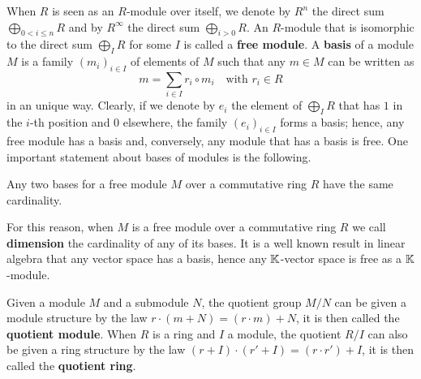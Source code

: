 When $R$ is seen as an $R$-module over itself, we denote by $R^n$ the
direct sum $\bigoplus_{0<i\le n}R$ and by $R^\infty$ the direct sum
$\bigoplus_{i>0}R$. An $R$-module that is isomorphic to the direct sum
$\bigoplus_{I}R$ for some $I$ is called a
\textbf{free module}. A \textbf{basis}
of a module $M$ is a family $(m_i)_{i\in I}$ of elements of $M$ such
that any $m\in M$ can be written as 
\begin{equation}
  \label{eq:module-basis}
  m = \sum_{i\in I} r_i\circ m_i
  \quad\text{with $r_i\in R$}
\end{equation}
in an unique way. Clearly, if we denote by $e_i$ the element of
$\bigoplus_IR$ that has $1$ in the $i$-th position and $0$ elsewhere,
the family $(e_i)_{i\in I}$ forms a basis; hence, any free module has
a basis and, conversely, any module that has a basis is free. One
important statement about bases of modules is the following.

\begin{proposition}
  \label{th:invariant-basis}
  Any two bases for a free module $M$ over a commutative ring $R$ have
  the same cardinality.
\end{proposition}

For this reason, when $M$ is a free module over a commutative ring $R$
we call  
 
\textbf{dimension} the cardinality of
any of its bases. It is a well known result in linear algebra that any
vector space has a basis, hence any $\mathbb{K}$-vector space is free as a
$\mathbb{K}$-module.

Given a module $M$ and a submodule $N$, the quotient group $M/N$ can
be given a module structure by the law $r\cdot(m+N)=(r\cdot m)+N$, it
is then called the \textbf{quotient
  module}. When $R$ is a ring and $I$ a module, the quotient $R/I$ can
also be given a ring structure by the law $(r+I)\cdot(r'+I)=(r\cdot
r')+I$, it is then called the \textbf{quotient
  ring}.

